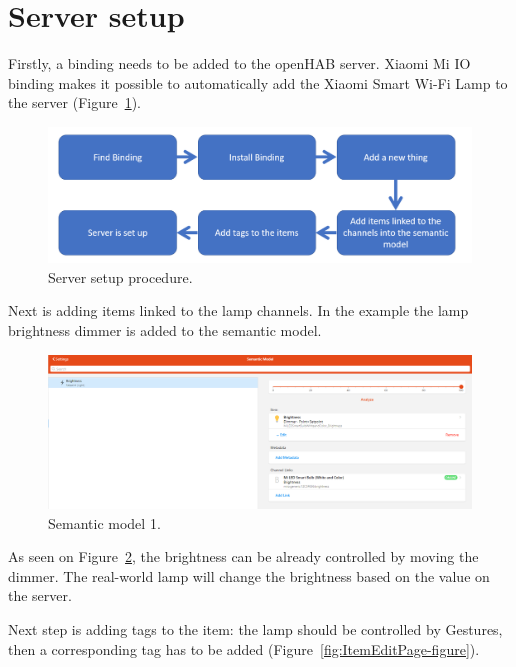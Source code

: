 \section{Server setup}
Firstly, a binding needs to be added to the openHAB server. Xiaomi Mi IO binding makes it possible to automatically add the Xiaomi Smart Wi-Fi Lamp to the server (Figure~\ref{fig:ServerSetupProcedure-figure}).

\begin{figure}
  \centering
  \includegraphics[width=0.9\linewidth]{figures/ServerSetupProcedure.png}
  \caption{Server setup procedure.}
  \label{fig:ServerSetupProcedure-figure}
\end{figure}

Next is adding items linked to the lamp channels. In the example the lamp brightness dimmer is added to the semantic model.

\begin{figure}
  \centering
  \includegraphics[width=0.9\linewidth]{figures/SemanticModelOne.png}
  \caption{Semantic model 1.}
  \label{fig:SemanticModelOne-figure}
\end{figure}

As seen on Figure~\ref{fig:SemanticModelOne-figure}, the brightness can be already controlled by moving the dimmer. The real-world lamp will change the brightness based on the value on the server.

Next step is adding tags to the item: the lamp should be controlled by Gestures, then a corresponding tag has to be added (Figure~\ref{fig:ItemEditPage-figure}).

